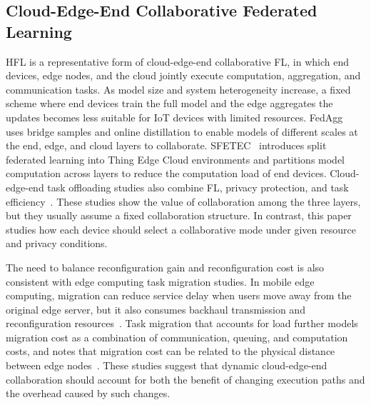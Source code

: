 \documentclass[5p,times]{elsarticle}
\theoremstyle{plain}
\theoremstyle{definition}
\theoremstyle{remark}
\begin{document}
\subsection{Cloud-Edge-End Collaborative Federated Learning}

HFL is a representative form of cloud-edge-end collaborative FL, in which end
devices, edge nodes, and the cloud jointly execute computation, aggregation, and
communication tasks.
As model size and system heterogeneity increase, a fixed scheme where end
devices train the full model and the edge aggregates the updates becomes less
suitable for IoT devices with limited resources.
FedAgg~\cite{BSBODP} uses bridge samples and online distillation to enable
models of different scales at the end, edge, and cloud layers to collaborate.
SFETEC~\cite{SFETEC} introduces split federated learning into Thing Edge Cloud
environments and partitions model computation across layers to reduce the
computation load of end devices.
Cloud-edge-end task offloading studies also combine FL, privacy protection, and
task efficiency~\cite{dong2026privacyoffloading}.
These studies show the value of collaboration among the three layers, but they
usually assume a fixed collaboration structure.
In contrast, this paper studies how each device should select a collaborative
mode under given resource and privacy conditions.

The need to balance reconfiguration gain and reconfiguration cost is also
consistent with edge computing task migration studies. In mobile edge computing,
migration can reduce service delay when users move away from the original edge
server, but it also consumes backhaul transmission and reconfiguration
resources~\cite{ZHANG2019111}. Task migration that accounts for load further
models migration cost as a combination of communication, queuing, and
computation costs, and notes that migration cost can be related to the physical
distance between edge nodes~\cite{ZHU2024303}. These studies suggest that
dynamic cloud-edge-end collaboration should account for both the benefit of
changing execution paths and the overhead caused by such changes.
\end{document}
